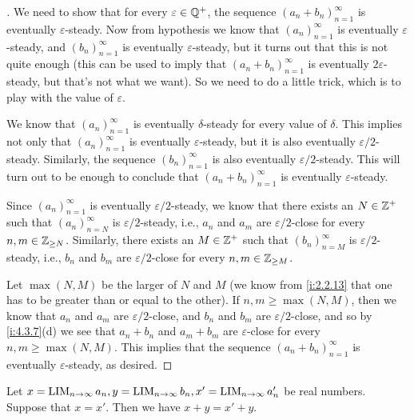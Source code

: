 \begin{proof}[]
  We need to show that for every \(\varepsilon \in \mathbb{Q}^+\), the sequence \((a_n + b_n)_{n = 1}^{\infty}\) is eventually \(\varepsilon\)-steady.
  Now from hypothesis we know that \((a_n)_{n = 1}^{\infty}\) is eventually \(\varepsilon\)-steady, and \((b_n)_{n = 1}^{\infty}\) is eventually \(\varepsilon\)-steady, but it turns out that this is not quite enough
  (this can be used to imply that \((a_n + b_n)_{n = 1}^{\infty}\) is eventually \(2\varepsilon\)-steady, but that's not what we want).
  So we need to do a little trick, which is to play with the value of \(\varepsilon\).

  We know that \((a_n)_{n = 1}^{\infty}\) is eventually \(\delta\)-steady for every value of \(\delta\).
  This implies not only that \((a_n)_{n = 1}^{\infty}\) is eventually \(\varepsilon\)-steady, but it is also eventually \(\varepsilon / 2\)-steady.
  Similarly, the sequence \((b_n)_{n = 1}^{\infty}\) is also eventually \(\varepsilon / 2\)-steady.
  This will turn out to be enough to conclude that \((a_n + b_n)_{n = 1}^{\infty}\) is eventually \(\varepsilon\)-steady.

  Since \((a_n)_{n = 1}^{\infty}\) is eventually \(\varepsilon / 2\)-steady, we know that there exists an \(N \in \mathbb{Z}^+\) such that \((a_n)_{n = N}^{\infty}\) is \(\varepsilon / 2\)-steady, i.e., \(a_n\) and \(a_m\) are \(\varepsilon / 2\)-close for every \(n, m \in \mathbb{Z}_{\geq N}\).
  Similarly, there exists an \(M \in \mathbb{Z}^+\) such that \((b_n)_{n = M}^{\infty}\) is \(\varepsilon / 2\)-steady, i.e., \(b_n\) and \(b_m\) are \(\varepsilon / 2\)-close for every \(n, m \in \mathbb{Z}_{\geq M}\).

  Let \(\max(N, M)\) be the larger of \(N\) and \(M\)
  (we know from \cref{i:2.2.13} that one has to be greater than or equal to the other).
  If \(n, m \geq \max(N, M)\), then we know that \(a_n\) and \(a_m\) are \(\varepsilon / 2\)-close, and \(b_n\) and \(b_m\) are \(\varepsilon / 2\)-close, and so by \cref{i:4.3.7}(d) we see that \(a_n + b_n\) and \(a_m + b_m\) are \(\varepsilon\)-close for every \(n, m \geq \max(N, M)\).
  This implies that the sequence \((a_n + b_n)_{n = 1}^{\infty}\) is eventually \(\varepsilon\)-steady, as desired.
\end{proof}

\begin{lem}\label{i:5.3.7}
  Let \(x = \operatorname*{LIM}_{n \to \infty} a_n, y = \operatorname*{LIM}_{n \to \infty} b_n, x' = \operatorname*{LIM}_{n \to \infty} a_n'\) be real numbers.
  Suppose that \(x = x'\).
  Then we have \(x + y = x' + y\).
\end{lem}

